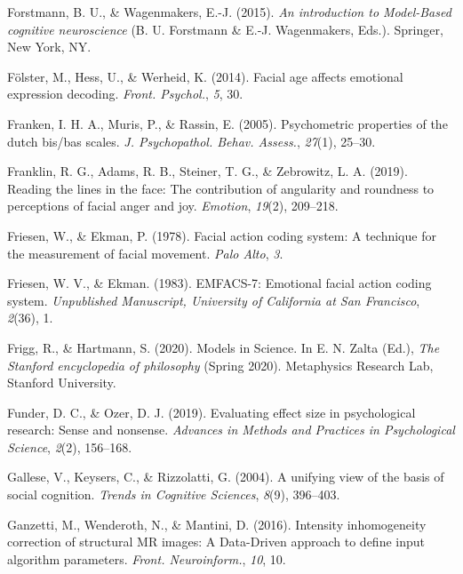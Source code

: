 \documentclass[12pt,american,a4paper,oneside,]{memoir} %
\begin{document}
\leavevmode\hypertarget{ref-Forstmann2015-rz}{}%
Forstmann, B. U., \& Wagenmakers, E.-J. (2015). \emph{An introduction to Model-Based cognitive neuroscience} (B. U. Forstmann \& E.-J. Wagenmakers, Eds.). Springer, New York, NY.

\leavevmode\hypertarget{ref-Folster2014-zy}{}%
Fölster, M., Hess, U., \& Werheid, K. (2014). Facial age affects emotional expression decoding. \emph{Front. Psychol.}, \emph{5}, 30.

\leavevmode\hypertarget{ref-Franken2005-jg}{}%
Franken, I. H. A., Muris, P., \& Rassin, E. (2005). Psychometric properties of the dutch bis/bas scales. \emph{J. Psychopathol. Behav. Assess.}, \emph{27}(1), 25--30.

\leavevmode\hypertarget{ref-Franklin2019-qo}{}%
Franklin, R. G., Adams, R. B., Steiner, T. G., \& Zebrowitz, L. A. (2019). Reading the lines in the face: The contribution of angularity and roundness to perceptions of facial anger and joy. \emph{Emotion}, \emph{19}(2), 209--218.

\leavevmode\hypertarget{ref-Friesen1978-tp}{}%
Friesen, W., \& Ekman, P. (1978). Facial action coding system: A technique for the measurement of facial movement. \emph{Palo Alto}, \emph{3}.

\leavevmode\hypertarget{ref-Friesen1983-ft}{}%
Friesen, W. V., \& Ekman. (1983). EMFACS-7: Emotional facial action coding system. \emph{Unpublished Manuscript, University of California at San Francisco}, \emph{2}(36), 1.

\leavevmode\hypertarget{ref-Frigg2020-hp}{}%
Frigg, R., \& Hartmann, S. (2020). Models in Science. In E. N. Zalta (Ed.), \emph{The Stanford encyclopedia of philosophy} (Spring 2020). Metaphysics Research Lab, Stanford University.

\leavevmode\hypertarget{ref-Funder2019-ow}{}%
Funder, D. C., \& Ozer, D. J. (2019). Evaluating effect size in psychological research: Sense and nonsense. \emph{Advances in Methods and Practices in Psychological Science}, \emph{2}(2), 156--168.

\leavevmode\hypertarget{ref-gallese2004unifying}{}%
Gallese, V., Keysers, C., \& Rizzolatti, G. (2004). A unifying view of the basis of social cognition. \emph{Trends in Cognitive Sciences}, \emph{8}(9), 396--403.

\leavevmode\hypertarget{ref-Ganzetti2016-yy}{}%
Ganzetti, M., Wenderoth, N., \& Mantini, D. (2016). Intensity inhomogeneity correction of structural MR images: A Data-Driven approach to define input algorithm parameters. \emph{Front. Neuroinform.}, \emph{10}, 10.
\end{document}
